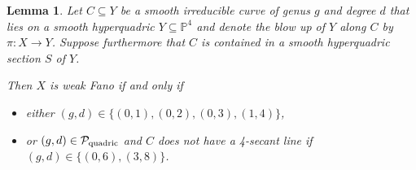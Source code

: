 \documentclass[english,11pt,reqno]{amsart}
\newcommand{\sub}{\subseteq}
\newcommand{\Pfour}{\mathbb{P}^4}
\newtheorem{lem}[thm]{Lemma}
\begin{document}
\begin{lem} \label{lem:quartic_del_Pezzo_weak_Fano_implies_in_list}
Let $C \sub Y$ be a smooth irreducible curve of genus $g$ and degree $d$ that lies on a smooth hyperquadric $Y \sub \Pfour$ and denote the blow up of $Y$ along $C$ by $\pi:X\rightarrow Y$. Suppose furthermore that $C$ is contained in a smooth hyperquadric section $S$ of $Y$. \par
Then $X$ is weak Fano if and only if \begin{itemize}
\item either $ (g,d)\in \{(0,1), (0,2), (0,3), (1,4)\}$,
\item or $(g,d)\in \mathcal{P}_{\textup{quadric}}$ and $C$ does not have a 4-secant line if $(g,d)\in \{(0,6),(3,8)\}$.
\end{itemize} 
\end{lem}
%
%
%
\end{document}
